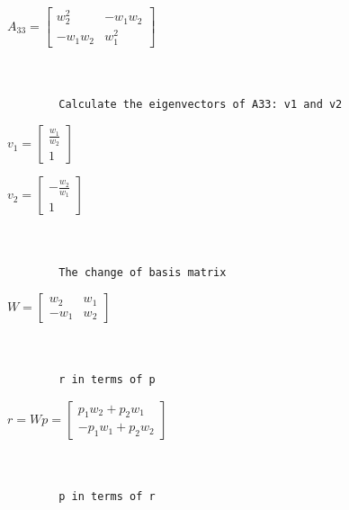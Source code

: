 \documentclass[11pt]{article}
\begin{document}
            $\displaystyle A_{33} = \left[\begin{matrix}w_{2}^{2} & - w_{1} w_{2}\\- w_{1} w_{2} & w_{1}^{2}\end{matrix}\right]$

            
            \begin{Verbatim}[commandchars=\\\{\}]


        Calculate the eigenvectors of A33: v1 and v2
            \end{Verbatim}

            $\displaystyle v_{1} = \left[\begin{matrix}\frac{w_{1}}{w_{2}}\\1\end{matrix}\right]$

            
            $\displaystyle v_{2} = \left[\begin{matrix}- \frac{w_{2}}{w_{1}}\\1\end{matrix}\right]$

            
            \begin{Verbatim}[commandchars=\\\{\}]


        The change of basis matrix
            \end{Verbatim}

            $\displaystyle W = \left[\begin{matrix}w_{2} & w_{1}\\- w_{1} & w_{2}\end{matrix}\right]$

            
            \begin{Verbatim}[commandchars=\\\{\}]


        r in terms of p
            \end{Verbatim}

            $\displaystyle r = Wp = \left[\begin{matrix}p_{1} w_{2} + p_{2} w_{1}\\- p_{1} w_{1} + p_{2} w_{2}\end{matrix}\right]$

            
            \begin{Verbatim}[commandchars=\\\{\}]


        p in terms of r
            \end{Verbatim}
\end{document}
